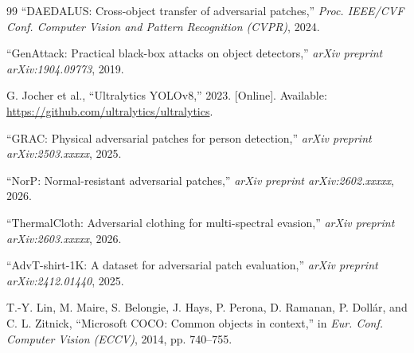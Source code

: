 \documentclass[a4paper,fleqn]{cas-dc}
\begin{document}
\begin{thebibliography}{99}
 ``DAEDALUS: Cross-object transfer of adversarial patches,'' \emph{Proc. IEEE/CVF Conf. Computer Vision and Pattern Recognition (CVPR)}, 2024.

 ``GenAttack: Practical black-box attacks on object detectors,'' \emph{arXiv preprint arXiv:1904.09773}, 2019.

 G. Jocher et al., ``Ultralytics YOLOv8,'' 2023. [Online]. Available: \url{https://github.com/ultralytics/ultralytics}.

 ``GRAC: Physical adversarial patches for person detection,'' \emph{arXiv preprint arXiv:2503.xxxxx}, 2025.

 ``NorP: Normal-resistant adversarial patches,'' \emph{arXiv preprint arXiv:2602.xxxxx}, 2026.

 ``ThermalCloth: Adversarial clothing for multi-spectral evasion,'' \emph{arXiv preprint arXiv:2603.xxxxx}, 2026.

 ``AdvT-shirt-1K: A dataset for adversarial patch evaluation,'' \emph{arXiv preprint arXiv:2412.01440}, 2025.

 T.-Y. Lin, M. Maire, S. Belongie, J. Hays, P. Perona, D. Ramanan, P. Doll\'ar, and C. L. Zitnick, ``Microsoft COCO: Common objects in context,'' in \emph{Eur. Conf. Computer Vision (ECCV)}, 2014, pp. 740--755.

\end{thebibliography}
\end{document}
